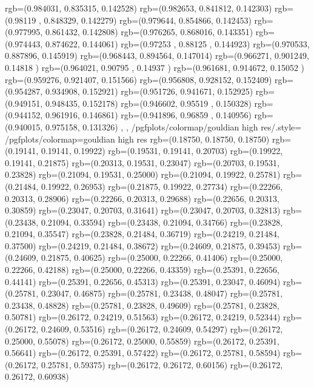 {{{		  rgb=(0.984031,  0.835315,  0.142528)
		  rgb=(0.982653,  0.841812,  0.142303)
		  rgb=(0.98119 ,  0.848329,  0.142279)
		  rgb=(0.979644,  0.854866,  0.142453)
		  rgb=(0.977995,  0.861432,  0.142808)
		  rgb=(0.976265,  0.868016,  0.143351)
		  rgb=(0.974443,  0.874622,  0.144061)
		  rgb=(0.97253 ,  0.88125 ,  0.144923)
		  rgb=(0.970533,  0.887896,  0.145919)
		  rgb=(0.968443,  0.894564,  0.147014)
		  rgb=(0.966271,  0.901249,  0.14818 )
		  rgb=(0.964021,  0.90795 ,  0.14937 )
		  rgb=(0.961681,  0.914672,  0.15052 )
		  rgb=(0.959276,  0.921407,  0.151566)
		  rgb=(0.956808,  0.928152,  0.152409)
		  rgb=(0.954287,  0.934908,  0.152921)
		  rgb=(0.951726,  0.941671,  0.152925)
		  rgb=(0.949151,  0.948435,  0.152178)
		  rgb=(0.946602,  0.95519 ,  0.150328)
		  rgb=(0.944152,  0.961916,  0.146861)
		  rgb=(0.941896,  0.96859 ,  0.140956)
		  rgb=(0.940015,  0.975158,  0.131326)
		},
	},
	/pgfplots/colormap/gouldian high res/.style={%
		/pgfplots/colormap={gouldian high res}{%
			rgb=(0.18750, 0.18750, 0.18750)
			rgb=(0.19141, 0.19141, 0.19922)
			rgb=(0.19531, 0.19141, 0.20703)
			rgb=(0.19922, 0.19141, 0.21875)
			rgb=(0.20313, 0.19531, 0.23047)
			rgb=(0.20703, 0.19531, 0.23828)
			rgb=(0.21094, 0.19531, 0.25000)
			rgb=(0.21094, 0.19922, 0.25781)
			rgb=(0.21484, 0.19922, 0.26953)
			rgb=(0.21875, 0.19922, 0.27734)
			rgb=(0.22266, 0.20313, 0.28906)
			rgb=(0.22266, 0.20313, 0.29688)
			rgb=(0.22656, 0.20313, 0.30859)
			rgb=(0.23047, 0.20703, 0.31641)
			rgb=(0.23047, 0.20703, 0.32813)
			rgb=(0.23438, 0.21094, 0.33594)
			rgb=(0.23438, 0.21094, 0.34766)
			rgb=(0.23828, 0.21094, 0.35547)
			rgb=(0.23828, 0.21484, 0.36719)
			rgb=(0.24219, 0.21484, 0.37500)
			rgb=(0.24219, 0.21484, 0.38672)
			rgb=(0.24609, 0.21875, 0.39453)
			rgb=(0.24609, 0.21875, 0.40625)
			rgb=(0.25000, 0.22266, 0.41406)
			rgb=(0.25000, 0.22266, 0.42188)
			rgb=(0.25000, 0.22266, 0.43359)
			rgb=(0.25391, 0.22656, 0.44141)
			rgb=(0.25391, 0.22656, 0.45313)
			rgb=(0.25391, 0.23047, 0.46094)
			rgb=(0.25781, 0.23047, 0.46875)
			rgb=(0.25781, 0.23438, 0.48047)
			rgb=(0.25781, 0.23438, 0.48828)
			rgb=(0.25781, 0.23828, 0.49609)
			rgb=(0.25781, 0.23828, 0.50781)
			rgb=(0.26172, 0.24219, 0.51563)
			rgb=(0.26172, 0.24219, 0.52344)
			rgb=(0.26172, 0.24609, 0.53516)
			rgb=(0.26172, 0.24609, 0.54297)
			rgb=(0.26172, 0.25000, 0.55078)
			rgb=(0.26172, 0.25000, 0.55859)
			rgb=(0.26172, 0.25391, 0.56641)
			rgb=(0.26172, 0.25391, 0.57422)
			rgb=(0.26172, 0.25781, 0.58594)
			rgb=(0.26172, 0.25781, 0.59375)
			rgb=(0.26172, 0.26172, 0.60156)
			rgb=(0.26172, 0.26172, 0.60938)
}}}

